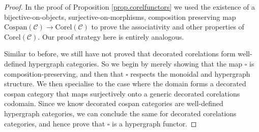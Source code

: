 \begin{proof}
  In the proof of Proposition \ref{prop.corelfunctors} we used the existence of a
  bijective-on-objects, surjective-on-morphisms, composition preserving map
  $\mathrm{Cospan}(\mathcal C) \to\mathrm{Corel}(\mathcal C)$ to prove the
  associativity and other properties of $\mathrm{Corel}(\mathcal C)$. Our proof
  strategy here is entirely analogous.

  Similar to before, we still have not proved that decorated corelations form
  well-defined hypergraph categories. So we begin by merely showing that the map
  $\square$ is composition-preserving, and then that $\square$ respects the
  monoidal and hypergraph structure. We then specialise to the case where the
  domain forms a decorated cospan category that maps surjectively onto a generic
  decorated corelations codomain. Since we know decorated cospan categories are
  well-defined hypergraph categories, we can conclude the same for decorated
  corelations categories, and hence prove that $\square$ is a hypergraph functor. 
  

\end{proof}
